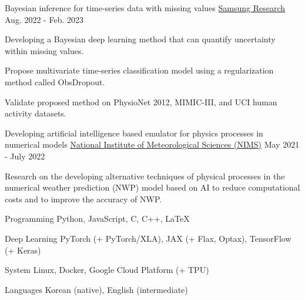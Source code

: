 \documentclass[11pt, a4paper]{cv}
\begin{document}
\begin{cventries}

  \cvproject
    {Bayesian inference for time-series data with missing values} %
    {\href{https://research.samsung.com}{Samsung Research}} %
    {Aug. 2022 - Feb. 2023} %
    {
      \begin{cvitems} %
        \item {Developing a Bayesian deep learning method that can quantify uncertainty within missing values.}
        \item {Propose multivariate time-series classification model using a regularization method called ObsDropout.}
        \item {Validate proposed method on PhysioNet 2012, MIMIC-III, and UCI human activity datasets.}
      \end{cvitems}
    }

  \cvproject
    {Developing artificial intelligence based emulator for physics processes in numerical models} %
    {\href{http://www.nims.go.kr/AE/MA/main.jsp}{National Institute of Meteorological Sciences (NIMS)}} %
    {May 2021 - July 2022} %
    {
      \begin{cvitems} %
        \item {Research on the developing alternative techniques of physical processes in the numerical weather prediction (NWP) model based on AI to reduce computational costs and to improve the accuracy of NWP.}
      \end{cvitems}
    }

\end{cventries}


\begin{cvskills}

  \cvskill
    {Programming} %
    {Python, JavaScript, C, C++, LaTeX} %

  \cvskill
    {Deep Learning} %
    {PyTorch (+ PyTorch/XLA), JAX (+ Flax, Optax), TensorFlow (+ Keras)} %

  \cvskill
    {System} %
    {Linux, Docker, Google Cloud Platform (+ TPU)} %

  \cvskill
    {Languages} %
    {Korean (native), English (intermediate)} %

\end{cvskills}

\end{document}
